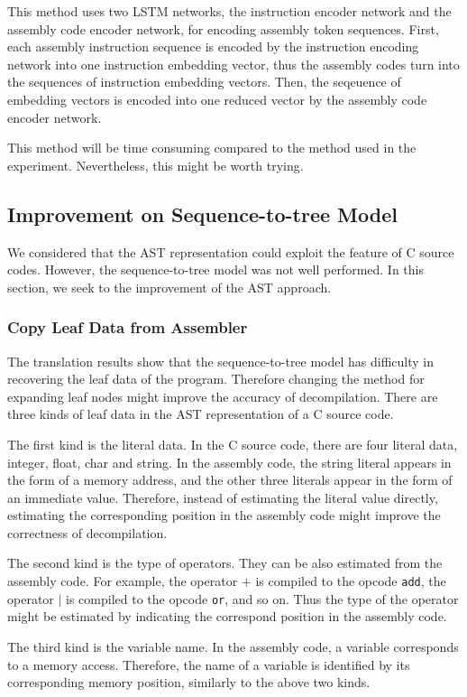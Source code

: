 \documentclass[senior,final,11pt]{iscs-thesis}
\begin{document}
This method uses two LSTM networks, the instruction encoder network and the assembly code encoder network, for encoding assembly token sequences.
First, each assembly instruction sequence is encoded by the instruction encoding network into one instruction embedding vector, 
thus the assembly codes turn into the sequences of instruction embedding vectors.
Then, the seqeuence of embedding vectors is encoded into one reduced vector by the assembly code encoder network.

This method will be time consuming compared to the method used in the experiment.
Nevertheless, this might be worth trying.

\subsection{Improvement on Sequence-to-tree Model}
We considered that the AST representation could exploit the feature of C source codes. 
However, the sequence-to-tree model was not well performed.
In this section, we seek to the improvement of the AST approach.
\subsubsection{Copy Leaf Data from Assembler}
The translation results show that the sequence-to-tree model has difficulty in recovering the leaf data of the program.
Therefore changing the method for expanding leaf nodes might improve the accuracy of decompilation.
There are three kinds of leaf data in the AST representation of a C source code.

The first kind is the literal data. In the C source code, there are four literal data, integer, float, char and string. 
In the assembly code, the string literal appears in the form of a memory address, and the other three literals appear in the form of an immediate value.
Therefore, instead of estimating the literal value directly, 
estimating the corresponding position in the assembly code might improve the correctness of decompilation.

The second kind is the type of operators. They can be also estimated from the assembly code.
For example, the operator $ + $ is compiled to the opcode \texttt{add}, the operator $ | $ is compiled to the opcode \texttt{or}, and so on. 
Thus the type of the operator might be estimated by indicating the correspond position in the assembly code.

The third kind is the variable name. In the assembly code, a variable corresponds to a memory access. 
Therefore, the name of a variable is identified by its corresponding memory position, similarly to the above two kinds.
\end{document}

